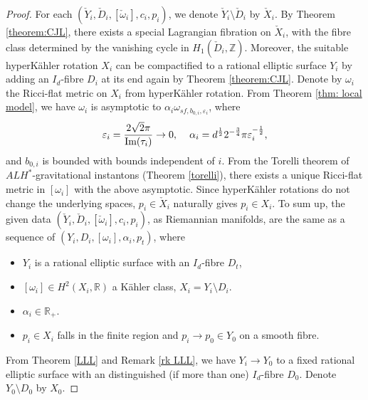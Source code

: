 \documentclass[11pt]{amsart}
\theoremstyle{plain}
\theoremstyle{definition}
\numberwithin{equation}{section}
\renewcommand{\epsilon}{\varepsilon}
\begin{document}
\begin{proof}
For each $(\check{Y}_i,\check{D}_i,[\check{\omega}_i],c_i,p_i)$, we denote $\check{Y}_i\setminus \check{D}_i$ by $\check{X}_i$. By Theorem \ref{theorem:CJL}, there exists a special Lagrangian fibration on $\check{X}_i$, with the fibre class determined by the vanishing cycle in $H_1(\check{D}_i,\mathbb{Z})$. Moreover, the suitable hyperK\"ahler rotation $X_i$ can be compactified to a rational elliptic surface $Y_i$ by adding an $I_d$-fibre $D_i$ at its end again by Theorem \ref{theorem:CJL}. Denote by $\omega_i$ the Ricci-flat metric on $X_i$ from hyperK\"ahler rotation. From Theorem \ref{thm: local model}, we have $\omega_i$ is asymptotic to $\alpha_i\omega_{sf,b_{0,i},\epsilon_i}$, where 
 \begin{align*}
 	\epsilon_i=\frac{2\sqrt{2}\pi}{\mbox{Im}(\tau_i)}\rightarrow 0, \hspace{4mm}
 	\alpha_i=d^{\frac{1}{2}} 2^{-\frac{3}{4}}\pi\epsilon_i^{-\frac{1}{2}}, 
 \end{align*} and $b_{0,i}$ is bounded with bounds independent of $i$. From the Torelli theorem of $ALH^*$-gravitational instantons (Theorem \ref{torelli}), there exists a unique Ricci-flat metric in $[\omega_i]$ with the above asymptotic. 
Since hyperK\"ahler rotations do not change the underlying spaces, $p_i\in \check{X}_i$ naturally gives $p_i\in X_i$. To sum up, the given data $(\check{Y}_i,\check{D}_i,[\check{\omega}_i],c_i,p_i)$, as Riemannian manifolds, are the same as a sequence of $(Y_i,D_i,[\omega_i],\alpha_i, p_t)$, where 
\begin{itemize}
	\item $Y_i$ is a rational elliptic surface with an $I_d$-fibre $D_t$,
	\item $[\omega_i]\in H^2(X_i,\mathbb{R})$ a K\"ahler class, $X_i=Y_i\setminus D_i$.
	\item $\alpha_i\in \mathbb{R}_+$.
	\item $p_i\in X_i$ falls in the finite region and $p_i\rightarrow p_0\in Y_0$ on a smooth fibre. 
\end{itemize} From Theorem \ref{LLL} and Remark \ref{rk LLL}, we have $Y_i\rightarrow Y_0$ to a fixed rational elliptic surface with an distinguished (if more than one) $I_d$-fibre $D_0$. Denote $Y_0\setminus D_0$ by $X_0$. 
%





\end{proof}
\end{document}
